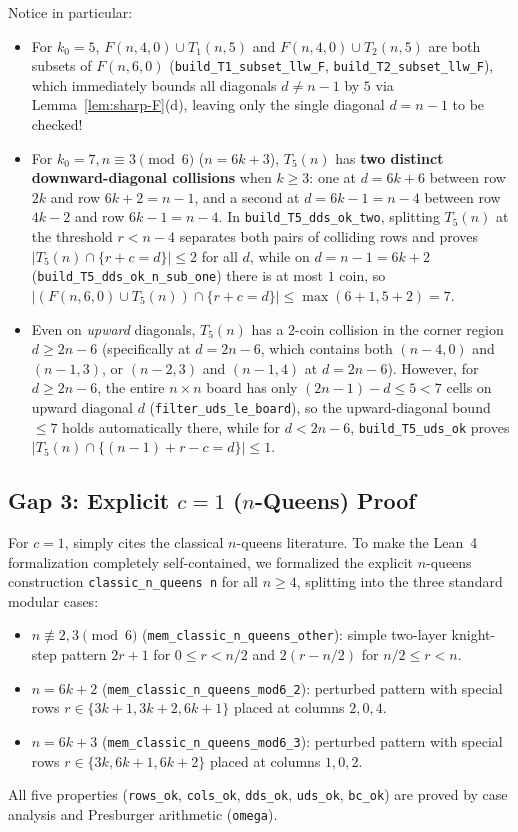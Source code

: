 \documentclass[11pt,a4paper]{article}
\theoremstyle{remark}
\begin{document}
Notice in particular:
\begin{itemize}[nosep]
  \item For $k_0 = 5$, $F(n, 4, 0) \cup T_1(n, 5)$ and $F(n, 4, 0) \cup T_2(n, 5)$ are both subsets of $F(n, 6, 0)$ (\texttt{build\_T1\_subset\_llw\_F}, \texttt{build\_T2\_subset\_llw\_F}), which immediately bounds all diagonals $d \ne n - 1$ by $5$ via Lemma~\ref{lem:sharp-F}(d), leaving only the single diagonal $d = n - 1$ to be checked!
  \item For $k_0 = 7, n \equiv 3 \pmod 6$ ($n = 6k + 3$), $T_5(n)$ has \textbf{two distinct downward-diagonal collisions} when $k \ge 3$: one at $d = 6k + 6$ between row $2k$ and row $6k + 2 = n - 1$, and a second at $d = 6k - 1 = n - 4$ between row $4k - 2$ and row $6k - 1 = n - 4$. In \texttt{build\_T5\_dds\_ok\_two}, splitting $T_5(n)$ at the threshold $r < n - 4$ separates both pairs of colliding rows and proves $|T_5(n) \cap \{r + c = d\}| \le 2$ for all $d$, while on $d = n - 1 = 6k + 2$ (\texttt{build\_T5\_dds\_ok\_n\_sub\_one}) there is at most $1$ coin, so $|(F(n,6,0) \cup T_5(n)) \cap \{r + c = d\}| \le \max(6 + 1, 5 + 2) = 7$.
  \item Even on \emph{upward} diagonals, $T_5(n)$ has a $2$-coin collision in the corner region $d \ge 2n - 6$ (specifically at $d = 2n - 6$, which contains both $(n-4, 0)$ and $(n-1, 3)$, or $(n-2, 3)$ and $(n-1, 4)$ at $d = 2n - 6$). However, for $d \ge 2n - 6$, the entire $n \times n$ board has only $(2n - 1) - d \le 5 < 7$ cells on upward diagonal $d$ (\texttt{filter\_uds\_le\_board}), so the upward-diagonal bound $\le 7$ holds automatically there, while for $d < 2n - 6$, \texttt{build\_T5\_uds\_ok} proves $|T_5(n) \cap \{(n-1)+r-c = d\}| \le 1$.
\end{itemize}

\subsection{Gap 3: Explicit $c = 1$ ($n$-Queens) Proof}

For $c = 1$, \cite{LLW1990} simply cites the classical $n$-queens literature. To make the Lean~4 formalization completely self-contained, we formalized the explicit $n$-queens construction \texttt{classic\_n\_queens n} for all $n \ge 4$, splitting into the three standard modular cases:
\begin{itemize}[nosep]
  \item $n \not\equiv 2, 3 \pmod 6$ (\texttt{mem\_classic\_n\_queens\_other}): simple two-layer knight-step pattern $2r + 1$ for $0 \le r < n/2$ and $2(r - n/2)$ for $n/2 \le r < n$.
  \item $n = 6k + 2$ (\texttt{mem\_classic\_n\_queens\_mod6\_2}): perturbed pattern with special rows $r \in \{3k+1, 3k+2, 6k+1\}$ placed at columns $2, 0, 4$.
  \item $n = 6k + 3$ (\texttt{mem\_classic\_n\_queens\_mod6\_3}): perturbed pattern with special rows $r \in \{3k, 6k+1, 6k+2\}$ placed at columns $1, 0, 2$.
\end{itemize}
All five properties (\texttt{rows\_ok}, \texttt{cols\_ok}, \texttt{dds\_ok}, \texttt{uds\_ok}, \texttt{bc\_ok}) are proved by case analysis and Presburger arithmetic (\texttt{omega}).
\end{document}
